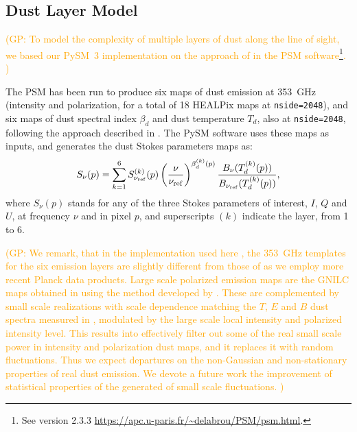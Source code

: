 \documentclass[twocolumn]{aastex631}
\newcommand{\giuse}[1]{\textcolor{orange}{(GP: #1)}}
\begin{document}
\subsection{Dust Layer Model} \label{sec:layers}
\giuse{To model the complexity of multiple layers of dust along the line of sight, we based our  PySM~3 implementation  on the approach of \cite{Martinez-Solaeche:2018} in the PSM software\footnote{See version 2.3.3 \url{https://apc.u-paris.fr/~delabrou/PSM/psm.html}.}. }

The PSM has been run to produce six maps of dust emission at 353~GHz (intensity and polarization, for a total of 18 HEALPix maps at {\tt nside=2048}), and six maps of dust spectral index $\beta_d$ and dust temperature $T_d$, also at {\tt nside=2048}, following the approach described in \cite{Martinez-Solaeche:2018}. The PySM software uses these maps as inputs, and generates the dust Stokes parameters maps as:
\begin{equation}
    S_\nu(p) = \sum_{k=1}^6 S^{(k)}_{\nu_{\rm ref}}(p)
    \left( \frac{\nu}{\nu_{\rm ref}} \right)^{\beta^{(k)}_d(p)}
    \frac{B_\nu(T^{(k)}_d(p))}{B_{\nu_{\rm ref}}(T^{(k)}_d(p))},
\end{equation}
where $S_\nu(p)$ stands for any of the three Stokes parameters of interest, $I$, $Q$ and $U$, at frequency $\nu$ and in pixel $p$, and superscripts ${(k)}$ indicate the layer, from 1 to 6.

\giuse{ We remark, that in the implementation used here , the 353~GHz templates for the six emission layers are slightly different from those of \cite{Martinez-Solaeche:2018} as we employ more recent Planck data products. Large scale polarized emission maps are the GNILC maps obtained in \cite{planck2016-l04} using the method developed by \cite{Remazeilles:2011}. These are complemented by small scale realizations with scale dependence matching the $T$, $E$ and $B$ dust spectra measured in \cite{planck2016-l11A}, modulated by the large scale local intensity and polarized intensity level. This results into effectively  filter out  some of the real small scale power in  intensity and polarization dust maps, and it replaces it with random fluctuations. Thus we expect departures on the non-Gaussian and non-stationary properties of real dust emission.  We devote a future work the improvement of statistical properties of the generated of small scale fluctuations. }
\end{document}
